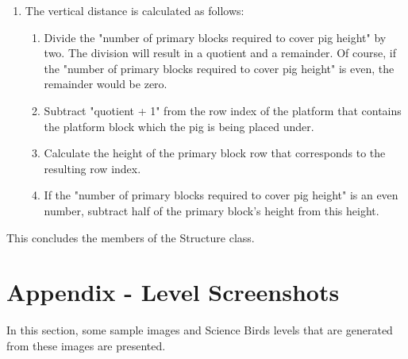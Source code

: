 \documentclass{dalthesis}
\begin{document}
\begin{enumerate}
\begin{enumerate}
\begin{enumerate}
      \item The vertical distance is calculated as follows:

      \begin{enumerate}
        \item Divide the "number of primary blocks required to cover pig height" by two. The division will result in a quotient and a remainder. Of course, if the "number of primary blocks required to cover pig height" is even, the remainder would be zero.

        \item Subtract "quotient + 1" from the row index of the platform that contains the platform block which the pig is being placed under.

        \item Calculate the height of the primary block row that corresponds to the resulting row index.

        \item If the "number of primary blocks required to cover pig height" is an even number, subtract half of the primary block's height from this height.
      \end{enumerate}
    \end{enumerate}
  \end{enumerate}
\end{enumerate}

This concludes the members of the Structure class.

\chapter{Appendix - Level Screenshots}

In this section, some sample images and Science Birds levels that are generated from these images are presented.
\end{document}
